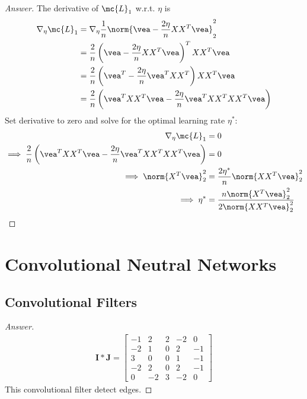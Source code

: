 \documentclass{article}
\begin{document}
	\subsubsection{}
	\begin{proof}[Answer]
		The derivative of $\mc{L}_1$ w.r.t. $\eta$ is 
		\begin{align}
			\nabla_\eta \mc{L}_1
			&= \nabla_\eta \frac{1}{n} \norm{
				\vea - \frac{2 \eta}{n} X X^T \vea
			}^2_2 \\
			&= \frac{2}{n} \left(\vea - \frac{2 \eta}{n} X X^T \vea \right)^T XX^T \vea \\
			&= \frac{2}{n} \left(
			\vea^T - \frac{2\eta}{n} \vea^T X X^T
			\right) XX^T \vea \\
			&= \frac{2}{n} \left(
			\vea^T X X^T \vea - \frac{2\eta}{n} \vea^T X X^T X X^T \vea
			\right)
		\end{align}
		Set derivative to zero and solve for the optimal learning rate $\eta^*$:
		\begin{align}
			\nabla_\eta \mc{L}_1 &= 0 \\
			\implies \frac{2}{n} \left(
			\vea^T X X^T \vea - \frac{2\eta}{n} \vea^T X X^T X X^T \vea
			\right) &= 0 \\
			\implies \norm{X^T \vea}_2^2 &= \frac{2 \eta^*}{n} \norm{XX^T \vea}_2^2 \\
			\implies \eta^* &= \frac{n\norm{X^T \vea}_2^2}{2 \norm{XX^T \vea}_2^2}
		\end{align}
	\end{proof}
	
	\section{Convolutional Neutral Networks}
	\subsection{Convolutional Filters}
	\begin{proof}[Answer]
		\begin{align}
			\textbf{I} * \textbf{J}
			= \begin{bmatrix}
				-1 & 2 & 2 & -2 & 0 \\
				-2 & 1 & 0 & 2 & -1 \\
				3 & 0 & 0 & 1 & -1 \\
				-2 & 2 & 0 & 2 & -1 \\
				0 & -2 & 3 & -2 & 0
			\end{bmatrix}
		\end{align}
		This convolutional filter detect edges.
	\end{proof}
	
\end{document}
